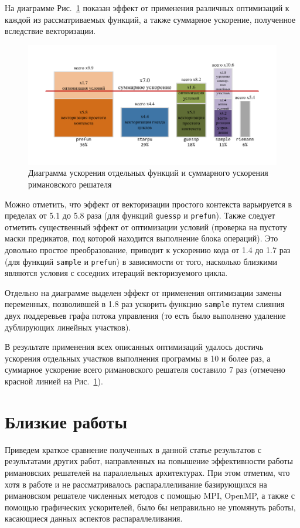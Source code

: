 \documentclass[utf8]{psta}
\begin{document}
На диаграмме Рис.~\ref{pic:perf} показан эффект от применения различных оптимизаций к каждой из рассматриваемых функций, а также суммарное ускорение, полученное вследствие векторизации.

\begin{figure}
\includegraphics[width=12cm]{pics/pic_perf}
\caption{Диаграмма ускорения отдельных функций и суммарного ускорения римановского решателя}
\label{pic:perf}
\end{figure}

Можно отметить, что эффект от векторизации простого контекста варьируется в пределах от 5.1 до 5.8 раза (для функций \texttt{guessp} и \texttt{prefun}).
Также следует отметить существенный эффект от оптимизации условий (проверка на пустоту маски предикатов, под которой находится выполнение блока операций).
Это довольно простое преобразование, приводит к ускорению кода от 1.4 до 1.7 раз (для функций \texttt{sample} и \texttt{prefun}) в зависимости от того, насколько близкими являются условия с соседних итераций векторизуемого цикла.

Отдельно на диаграмме выделен эффект от применения оптимизации замены переменных, позволившей в 1.8 раз ускорить функцию \texttt{sample} путем слияния двух поддеревьев графа потока управления (то есть было выполнено удаление дублирующих линейных участков).

В результате применения всех описанных оптимизаций удалось достичь ускорения отдельных участков выполнения программы в 10 и более раз, а суммарное ускорение всего римановского решателя составило 7 раз (отмечено красной линией на Рис.~\ref{pic:perf}).

\section{Близкие работы}

Приведем краткое сравнение полученных в данной статье результатов с результатами других работ, направленных на повышение эффективности работы римановских решателей на параллельных архитектурах.
При этом отметим, что хотя в работе и не рассматривалось распараллеливание базирующихся на римановском решателе численных методов с помощью MPI, OpenMP, а также с помощью графических ускорителей, было бы неправильно не упомянуть работы, касающиеся данных аспектов распараллеливания.
\end{document}
